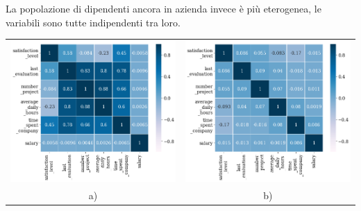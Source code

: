 	La popolazione di dipendenti ancora in azienda invece è più eterogenea, le variabili sono tutte indipendenti tra loro.
	\begin{center}
		\begin{tabular}{cc}
			\includegraphics[width=0.4\linewidth]{Images/Data_Understanding/Heatmap_left.png} &
			\includegraphics[width=0.4\linewidth]{Images/Data_Understanding/Heatmap_didnt_left.png} \\
			a) & b)\\
		\end{tabular}
		\vspace{-0.2cm}
	\end{center}
